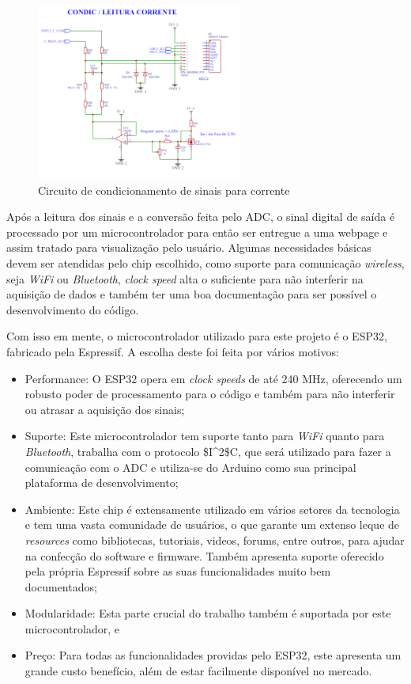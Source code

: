 \begin{figure}[htb!]
    \caption{Circuito de condicionamento de sinais para corrente}
    \label{fig:circ-cond-c}
    \includegraphics[width=0.6\textwidth]{figuras/circ-cond-c.png}
    \fonte{}
\end{figure}

Após a leitura dos sinais e a conversão feita pelo ADC, o sinal digital de saída é processado por um microcontrolador para então ser entregue a uma webpage e assim tratado para visualização pelo usuário. Algumas necessidades básicas devem ser atendidas pelo chip escolhido, como suporte para comunicação \textit{wireless}, seja \textit{WiFi} ou \textit{Bluetooth}, \textit{clock speed} alta o suficiente para não interferir na aquisição de dados e também ter uma boa documentação para ser possível o desenvolvimento do código.

Com isso em mente, o microcontrolador utilizado para este projeto é o ESP32, fabricado pela Espressif. A escolha deste foi feita por vários motivos:

\begin{itemize}
    \item Performance: O ESP32 opera em \textit{clock speeds} de até 240 MHz, oferecendo um robusto poder de processamento para o código e também para não interferir ou atrasar a aquisição dos sinais;
    \item Suporte: Este microcontrolador tem suporte tanto para \textit{WiFi} quanto para \textit{Bluetooth}, trabalha com o protocolo \gls{$I^2$C}, que será utilizado para fazer a comunicação com o \gls{ADC} e utiliza-se do Arduino como sua principal plataforma de desenvolvimento;
    \item Ambiente: Este chip é extensamente utilizado em vários setores da tecnologia e tem uma vasta comunidade de usuários, o que garante um extenso leque de \textit{resources} como bibliotecas, tutoriais, videos, forums, entre outros, para ajudar na confecção do software e firmware. Também apresenta suporte oferecido pela própria Espressif sobre as suas funcionalidades muito bem documentados;
    \item Modularidade: Esta parte crucial do trabalho também é suportada por este microcontrolador, e
    \item Preço: Para todas as funcionalidades providas pelo ESP32, este apresenta um grande custo benefício, além de estar facilmente disponível no mercado.
\end{itemize}

